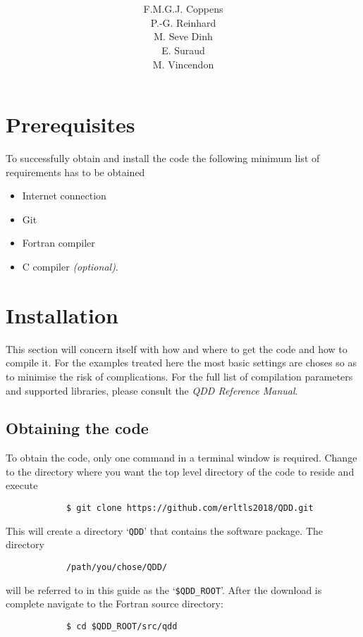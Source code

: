 \documentclass[11pt,a4paper]{article}
\title{\fontsize{50}{60}\selectfont{Quantum Dissipative Dynamics}\\\vspace{7ex}\fontsize{50}{60}\selectfont{\textsf{User manual}}\vspace{8ex}}
\author{F.M.G.J. Coppens\\P.-G. Reinhard\\M. Seve Dinh\\E. Suraud\\M. Vincendon}
\begin{document}
	\maketitle
	\thispagestyle{empty}
	\newpage
	\begingroup
		\hypersetup{hidelinks}
		\tableofcontents
	\endgroup
	\newpage

	\section{Prerequisites}
		To successfully obtain and install the code the following minimum list of requirements has to be obtained
		\begin{itemize}
			\item Internet connection
			\item Git
			\item Fortran compiler
			\item C compiler \textit{(optional)}.
		\end{itemize}	

	\section{Installation}	
		This section will concern itself with how and where to get the code and how to compile it. For the examples treated here the most basic settings are choses so as to minimise the risk of complications. For the full list of compilation parameters and supported libraries, please consult the \textit{QDD Reference Manual}.
		\subsection{Obtaining the code}
			To obtain the code, only one command in a terminal window is required. Change to the directory where you want the top level directory of the code to reside and execute
		\begin{verbatim}
			$ git clone https://github.com/erltls2018/QDD.git
		\end{verbatim}
		This will create a directory `\texttt{QDD}' that contains the software package. The directory
		\begin{verbatim}
			/path/you/chose/QDD/
		\end{verbatim}
		will be referred to in this guide as the `\texttt{\$QDD\_ROOT}'. After the download is complete navigate to the Fortran source directory:
		\begin{verbatim}
			$ cd $QDD_ROOT/src/qdd
		\end{verbatim}
		
\end{document}
